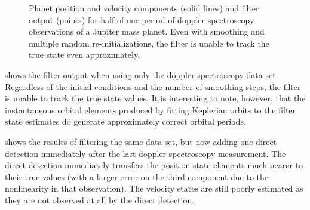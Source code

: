 \begin{figure}[ht]
 \begin{center}
 \end{center}
 \caption[Filter output for RV]{Planet position and velocity components (solid lines) and filter output (points) for half of one period of doppler spectroscopy observations of a Jupiter mass planet.  Even with smoothing and multiple random re-initializations, the filter is unable to track the true state even approximately. \label{fig:filtOutRV}}
\end{figure}
 shows the filter output when using only the doppler spectroscopy data set.  Regardless of the initial conditions and the number of smoothing steps, the filter is unable to track the true state values.  It is interesting to note, however, that the instantaneous orbital elements produced by fitting Keplerian orbits to the filter state estimates do generate approximately correct orbital periods.

  shows the results of filtering the same data set, but now adding one direct detection immediately after the last doppler spectroscopy measurement.  The direct detection immediately transfers the position state elements much nearer to their true values (with a larger error on the third component due to the nonlinearity in that observation).  The velocity states are still poorly estimated as they are not observed at all by the direct detection.

